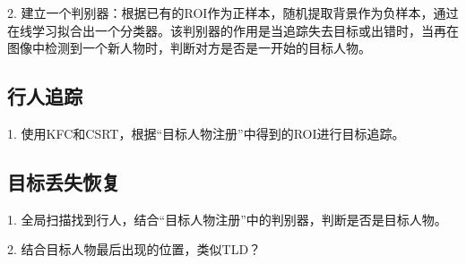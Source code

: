 2. 建立一个判别器：根据已有的ROI作为正样本，随机提取背景作为负样本，通过在线学习拟合出一个分类器。该判别器的作用是当追踪失去目标或出错时，当再在图像中检测到一个新人物时，判断对方是否是一开始的目标人物。

\subsection{行人追踪}

1. 使用KFC和CSRT，根据“目标人物注册”中得到的ROI进行目标追踪。

\subsection{目标丢失恢复}

1. 全局扫描找到行人，结合“目标人物注册”中的判别器，判断是否是目标人物。

2. 结合目标人物最后出现的位置，类似TLD？

